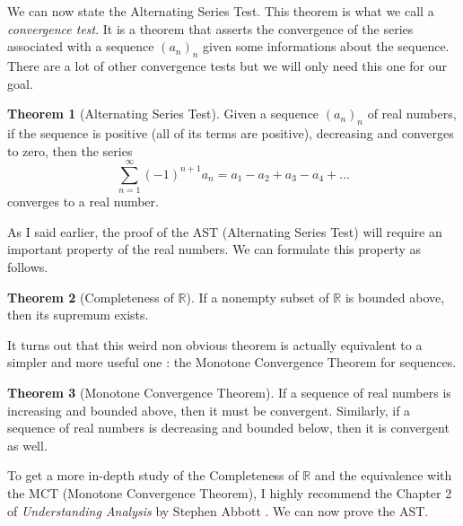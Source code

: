 \documentclass[12pt]{article}
\newcommand{\R}{\mathbb{R}}
\theoremstyle{definition}
\newtheorem*{theorem}{Theorem}
\newcounter{prop}[section]
\begin{document}
We can now state the Alternating Series Test. This theorem is what we call a \textit{convergence test}. It is a theorem that asserts the convergence of the series associated with a sequence $(a_n)_n$ given some informations about the sequence. There are a lot of other convergence tests but we will only need this one for our goal.

\begin{theorem}[Alternating Series Test]
    Given a sequence $(a_n)_n$ of real numbers, if the sequence is positive (all of its terms are positive), decreasing and converges to zero, then the series
    $$\sum_{n=1}^{\infty}(-1)^{n+1}a_n = a_1 - a_2 + a_3 - a_4 + ... $$
    converges to a real number.
\end{theorem}

As I said earlier, the proof of the AST (Alternating Series Test) will require an important property of the real numbers. We can formulate this property as follows.

\begin{theorem}[Completeness of $\R$]
    If a nonempty subset of $\R$ is bounded above, then its supremum exists.
\end{theorem}

It turns out that this weird non obvious theorem is actually equivalent to a simpler and more useful one : the Monotone Convergence Theorem for sequences.

\begin{theorem}[Monotone Convergence Theorem]
    If a sequence of real numbers is increasing and bounded above, then it must be convergent. Similarly, if a sequence of real numbers is decreasing and bounded below, then it is convergent as well.
\end{theorem}

To get a more in-depth study of the Completeness of $\R$ and the equivalence with the MCT (Monotone Convergence Theorem), I highly recommend the Chapter 2 of \textit{Understanding Analysis} by Stephen Abbott \cite{understanding_analysis}. We can now prove the AST.
\end{document}
